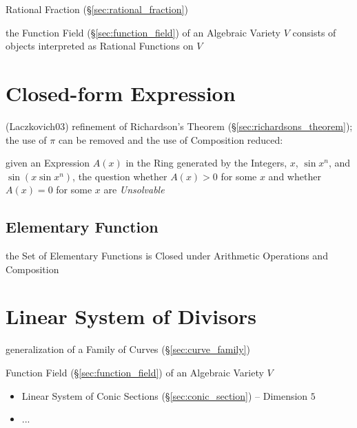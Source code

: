 Rational Fraction (\S\ref{sec:rational_fraction})

the Function Field (\S\ref{sec:function_field}) of an Algebraic Variety $V$
consists of objects interpreted as Rational Functions on $V$



\section{Closed-form Expression}\label{sec:closed_form_expression}

(Laczkovich03) refinement of Richardson's Theorem
(\S\ref{sec:richardsons_theorem}); the use of $\pi$ can be removed and the use
of Composition reduced:

given an Expression $A(x)$ in the Ring generated by the Integers, $x$, $\sin
x^n$, and $\sin(x \sin x^n)$, the question whether $A(x) > 0$ for some $x$ and
whether $A(x) = 0$ for some $x$ are \emph{Unsolvable}



\subsection{Elementary Function}\label{sec:elementary_function}

the Set of Elementary Functions is Closed under Arithmetic Operations and
Composition



\section{Linear System of Divisors}\label{sec:linear_system_of_divisors}

generalization of a Family of Curves (\S\ref{sec:curve_family})

Function Field (\S\ref{sec:function_field}) of an Algebraic Variety $V$

\begin{itemize}
  \item Linear System of Conic Sections (\S\ref{sec:conic_section}) --
    Dimension $5$
  \item ...
\end{itemize}



